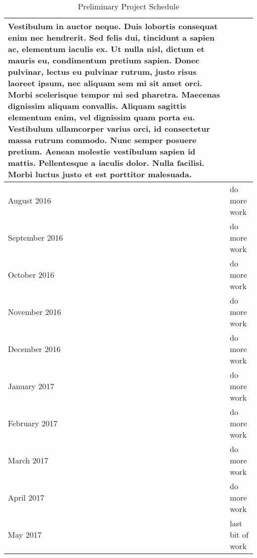 \begin{table}[ht]
\begin{tabularx}{\linewidth}{
    |>{\hsize=0.5\hsize}X|%
    >{\hsize=1.5\hsize}X|%
}
Vestibulum in auctor neque. Duis lobortis consequat enim nec hendrerit. Sed felis dui, tincidunt a sapien ac, elementum iaculis ex. Ut nulla nisl, dictum et mauris eu, condimentum pretium sapien. Donec pulvinar, lectus eu pulvinar rutrum, justo risus laoreet ipsum, nec aliquam sem mi sit amet orci. Morbi scelerisque tempor mi sed pharetra. Maecenas dignissim aliquam convallis. Aliquam sagittis elementum enim, vel dignissim quam porta eu. Vestibulum ullamcorper varius orci, id consectetur massa rutrum commodo. Nunc semper posuere pretium. Aenean molestie vestibulum sapien id mattis. Pellentesque a iaculis dolor. Nulla facilisi. Morbi luctus justo et est porttitor malesuada.  \\ \hline
 August 2016    & do more work \\ \hline
 September 2016 & do more work \\ \hline
 October 2016   & do more work \\ \hline
 November 2016  & do more work \\ \hline
 December 2016  & do more work \\ \hline
 January 2017   & do more work \\ \hline
 February 2017  & do more work \\ \hline
 March 2017     & do more work \\ \hline
 April 2017     & do more work \\ \hline
 May 2017       & last bit of work \\ \hline 
\end{tabularx}
\caption{Preliminary Project Schedule}
\label{sec:schedule:preliminary-schedule}
\end{table}



%
%
%
%
%
%
%
%
%
%
%

